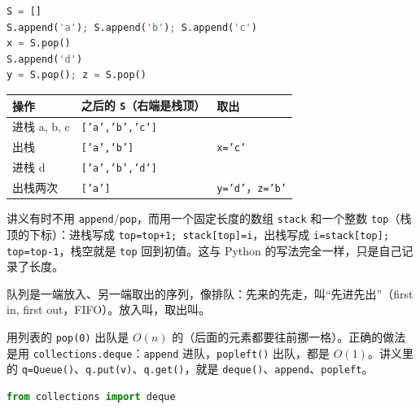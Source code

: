 \begin{example}
\begin{lstlisting}[language=Python,style=frag]
S = []
S.append('a'); S.append('b'); S.append('c')
x = S.pop()
S.append('d')
y = S.pop(); z = S.pop()
\end{lstlisting}
\begin{center}
\begin{tabular}{lll}
\toprule
操作 & 之后的 \texttt{S}（右端是栈顶） & 取出 \\
\midrule
进栈 a, b, c & \texttt{['a','b','c']} & \\
出栈 & \texttt{['a','b']} & \texttt{x='c'} \\
进栈 d & \texttt{['a','b','d']} & \\
出栈两次 & \texttt{['a']} & \texttt{y='d'}，\texttt{z='b'} \\
\bottomrule
\end{tabular}
\end{center}
\end{example}

讲义有时不用 \texttt{append}/\texttt{pop}，而用一个固定长度的数组 \texttt{stack} 和一个整数 \texttt{top}（栈顶的下标）：进栈写成 \texttt{top=top+1; stack[top]=i}，出栈写成 \texttt{i=stack[top]; top=top-1}，栈空就是 \texttt{top} 回到初值。这与 Python 的写法完全一样，只是自己记录了长度。


队列是一端放入、另一端取出的序列，像排队：先来的先走，叫“先进先出”（first in, first out，FIFO）。放入叫，取出叫。

用列表的 \texttt{pop(0)} 出队是 $O(n)$ 的（后面的元素都要往前挪一格）。正确的做法是用 \texttt{collections.deque}：\texttt{append} 进队，\texttt{popleft()} 出队，都是 $O(1)$。讲义里的 \texttt{q=Queue()}、\texttt{q.put(v)}、\texttt{q.get()}，就是 \texttt{deque()}、\texttt{append}、\texttt{popleft}。

\begin{lstlisting}[language=Python]
from collections import deque
\end{lstlisting}

